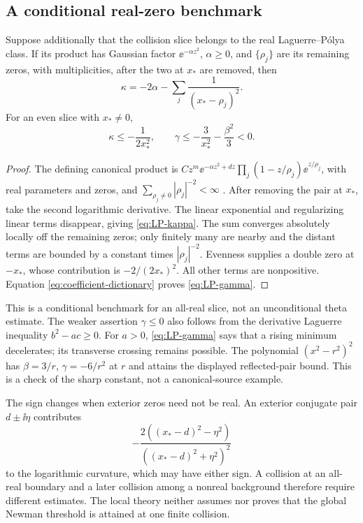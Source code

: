 \subsection{A conditional real-zero benchmark}
\begin{proposition}
\label{prop:LP-coefficients}
Suppose additionally that the collision slice belongs to the real
Laguerre--P\'olya class. If its product has Gaussian factor
\(\ee^{-\alpha z^2}\), \(\alpha\ge0\), and \(\{\rho_j\}\)
are its remaining zeros, with multiplicities, after the two at \(x_*\)
are removed, then
\begin{equation}\label{eq:LP-kappa}
 \kappa=-2\alpha-\sum_j\frac{1}{(x_*-\rho_j)^2}.
\end{equation}
For an even slice with \(x_*\ne0\),
\begin{equation}\label{eq:LP-gamma}
 \kappa\le-\frac{1}{2x_*^2},\qquad
 \gamma\le-\frac{3}{x_*^2}-\frac{\beta^2}{3}<0.
\end{equation}
\end{proposition}
\begin{proof}
The defining canonical product is
\(Cz^m\ee^{-\alpha z^2+d z}
\prod_j(1-z/\rho_j)\ee^{z/\rho_j}\), with real parameters and zeros,
and \(\sum_{\rho_j\ne0}|\rho_j|^{-2}<\infty\)
\cite[Definition~1.1]{Csordas2014PositiveKernels}.
After removing the pair at \(x_*\), take the second logarithmic
derivative. The linear exponential and regularizing linear terms
disappear, giving \eqref{eq:LP-kappa}. The sum converges absolutely
locally off the remaining zeros; only finitely many are nearby and
the distant terms are bounded by a constant times \(|\rho_j|^{-2}\).
Evenness supplies a double zero at \(-x_*\), whose contribution is
\(-2/(2x_*)^2\). All other terms are nonpositive. Equation
\eqref{eq:coefficient-dictionary} proves \eqref{eq:LP-gamma}.
\end{proof}

This is a conditional benchmark for an all-real slice, not an
unconditional theta estimate. The weaker assertion \(\gamma\le0\)
also follows from the derivative Laguerre inequality \(b^2-ac\ge0\).
For \(a>0\), \eqref{eq:LP-gamma} says that a rising minimum
decelerates; its transverse crossing remains possible. The polynomial
\((x^2-r^2)^2\) has \(\beta=3/r\), \(\gamma=-6/r^2\) at \(r\)
and attains the displayed reflected-pair bound. This is a check of
the sharp constant, not a canonical-source example.

The sign changes when exterior zeros need not be real. An exterior
conjugate pair \(d\pm\ii\eta\) contributes
\begin{equation}\label{eq:complex-exterior-curvature}
 -\frac{2((x_*-d)^2-\eta^2)}{((x_*-d)^2+\eta^2)^2}
\end{equation}
to the logarithmic curvature, which may have either sign. A collision
at an all-real boundary and a later collision among a nonreal
background therefore require different estimates. The local theory
neither assumes nor proves that the global Newman threshold is
attained at one finite collision.

